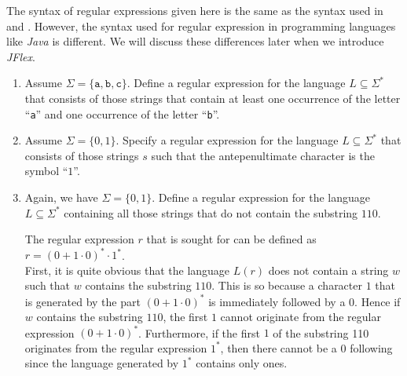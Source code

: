 \remarkEng 
The syntax of regular expressions given here is the same as the syntax used in  \cite{hopcroft:06}
and \cite{sipser:2006}.   However, the syntax used for regular expression in programming languages
like  \textsl{Java} is different.  We will discuss these differences later when we introduce \textsl{JFlex}.

\exerciseEng
\renewcommand{\labelenumi}{(\alph{enumi})}
\begin{enumerate}
\item Assume $\Sigma = \{ \mathtt{a}, \mathtt{b}, \mathtt{c} \}$.  Define a regular expression for the language
      $L \subseteq \Sigma^*$ that consists of those strings that contain at least one occurrence of
      the letter ``\texttt{a}'' and one occurrence of the letter ``\texttt{b}''.
\item Assume $\Sigma = \{ 0, 1 \}$.   Specify a regular expression for the language 
      $L \subseteq \Sigma^*$ that consists of those strings $s$ such that the antepenultimate
      character is the symbol  ``$1$''.
\item Again, we have $\Sigma = \{ 0, 1 \}$.   Define a regular expression for the language
      $L \subseteq \Sigma^*$ containing all those strings that do not contain the substring  $110$.

      \solutionEng
      The regular expression $r$ that is sought for can be defined as 
      \\[0.2cm]
      \hspace*{1.3cm}
      $r = (0 + 1 \cdot 0)^* \cdot 1^*$.
      \\[0.2cm]
      First, it is quite obvious that the language $L(r)$ does not contain a string $w$ such that
      $w$ contains the substring $110$.  This is so because a character $1$ that is generated by the
      part $(0 + 1 \cdot 0)^*$ is immediately followed by a $0$.  Hence if $w$ contains the
      substring $110$, the first $1$ cannot originate from the regular expression $(0 + 1 \cdot 0)^*$.
      Furthermore, if the first $1$ of the substring 110 originates from the regular expression
      $1^*$, then there cannot be a $0$ following since the language generated by $1^*$ contains
      only ones.


\end{enumerate}
